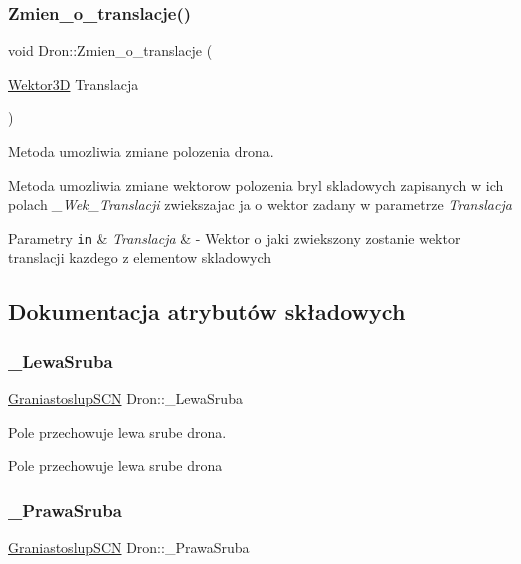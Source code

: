 \subsubsection{\texorpdfstring{Zmien\+\_\+o\+\_\+translacje()}{Zmien\_o\_translacje()}}
{\footnotesize\ttfamily void Dron\+::\+Zmien\+\_\+o\+\_\+translacje (\begin{DoxyParamCaption}\item[{\hyperlink{classSWektor}{Wektor3D}}]{Translacja }\end{DoxyParamCaption})}



Metoda umozliwia zmiane polozenia drona. 

Metoda umozliwia zmiane wektorow polozenia bryl skladowych zapisanych w ich polach {\itshape \+\_\+\+Wek\+\_\+\+Translacji} zwiekszajac ja o wektor zadany w parametrze {\itshape Translacja} 


\begin{DoxyParams}[1]{Parametry}
\mbox{\tt in}  & {\em Translacja} & -\/ Wektor o jaki zwiekszony zostanie wektor translacji kazdego z elementow skladowych \\
\hline
\end{DoxyParams}


\subsection{Dokumentacja atrybutów składowych}
\mbox{\label{classDron_a16ece01f1022ab49f1017f010db254b1}} 
\subsubsection{\texorpdfstring{\+\_\+\+Lewa\+Sruba}{\_LewaSruba}}
{\footnotesize\ttfamily \hyperlink{classGraniastoslupSCN}{Graniastoslup\+S\+CN} Dron\+::\+\_\+\+Lewa\+Sruba\hspace{0.3cm}{\ttfamily [private]}}



Pole przechowuje lewa srube drona. 

Pole przechowuje lewa srube drona \mbox{\label{classDron_abcf5121c081a80ec44fbfe1de9784f1d}} 
\subsubsection{\texorpdfstring{\+\_\+\+Prawa\+Sruba}{\_PrawaSruba}}
{\footnotesize\ttfamily \hyperlink{classGraniastoslupSCN}{Graniastoslup\+S\+CN} Dron\+::\+\_\+\+Prawa\+Sruba\hspace{0.3cm}{\ttfamily [private]}}




